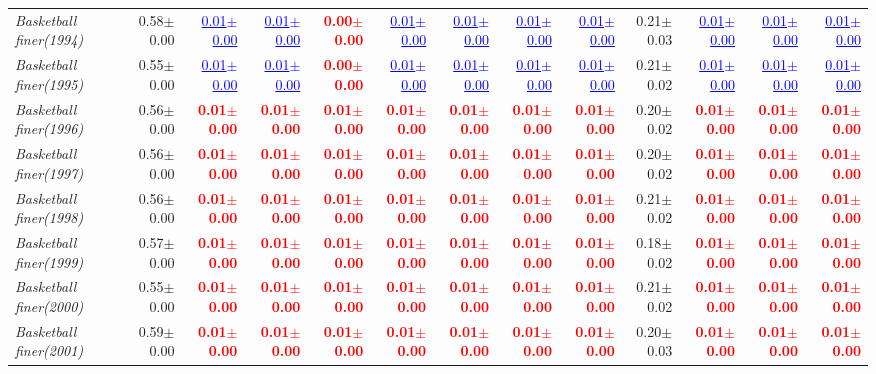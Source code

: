 \documentclass[nohyperref]{article}
\theoremstyle{plain}
\theoremstyle{definition}
\theoremstyle{remark}
\newcommand{\red}[1]{\textcolor{red}{\textbf{#1}}}
\newcommand{\blue}[1]{\textcolor{blue}{\underline{#1}}}
\begin{document}
\begin{table*}[!ht]
{\begin{tabular}{lrr|rrrrr|rrrrr}
			{\it Basketball finer(1994)} & 0.58$\pm$0.00 & \blue{0.01$\pm$0.00} & \blue{0.01$\pm$0.00} & \red{0.00$\pm$0.00} & \blue{0.01$\pm$0.00} & \blue{0.01$\pm$0.00} & \blue{0.01$\pm$0.00} & \blue{0.01$\pm$0.00} & 0.21$\pm$0.03 & \blue{0.01$\pm$0.00} & \blue{0.01$\pm$0.00} & \blue{0.01$\pm$0.00} \\
			{\it Basketball finer(1995)} & 0.55$\pm$0.00 & \blue{0.01$\pm$0.00} & \blue{0.01$\pm$0.00} & \red{0.00$\pm$0.00} & \blue{0.01$\pm$0.00} & \blue{0.01$\pm$0.00} & \blue{0.01$\pm$0.00} & \blue{0.01$\pm$0.00} & 0.21$\pm$0.02 & \blue{0.01$\pm$0.00} & \blue{0.01$\pm$0.00} & \blue{0.01$\pm$0.00} \\
			{\it Basketball finer(1996)} & 0.56$\pm$0.00 & \red{0.01$\pm$0.00} & \red{0.01$\pm$0.00} & \red{0.01$\pm$0.00} & \red{0.01$\pm$0.00} & \red{0.01$\pm$0.00} & \red{0.01$\pm$0.00} & \red{0.01$\pm$0.00} & 0.20$\pm$0.02 & \red{0.01$\pm$0.00} & \red{0.01$\pm$0.00} & \red{0.01$\pm$0.00} \\
			{\it Basketball finer(1997)} & 0.56$\pm$0.00 & \red{0.01$\pm$0.00} & \red{0.01$\pm$0.00} & \red{0.01$\pm$0.00} & \red{0.01$\pm$0.00} & \red{0.01$\pm$0.00} & \red{0.01$\pm$0.00} & \red{0.01$\pm$0.00} & 0.20$\pm$0.02 & \red{0.01$\pm$0.00} & \red{0.01$\pm$0.00} & \red{0.01$\pm$0.00} \\
			{\it Basketball finer(1998)} & 0.56$\pm$0.00 & \red{0.01$\pm$0.00} & \red{0.01$\pm$0.00} & \red{0.01$\pm$0.00} & \red{0.01$\pm$0.00} & \red{0.01$\pm$0.00} & \red{0.01$\pm$0.00} & \red{0.01$\pm$0.00} & 0.21$\pm$0.02 & \red{0.01$\pm$0.00} & \red{0.01$\pm$0.00} & \red{0.01$\pm$0.00} \\
			{\it Basketball finer(1999)} & 0.57$\pm$0.00 & \red{0.01$\pm$0.00} & \red{0.01$\pm$0.00} & \red{0.01$\pm$0.00} & \red{0.01$\pm$0.00} & \red{0.01$\pm$0.00} & \red{0.01$\pm$0.00} & \red{0.01$\pm$0.00} & 0.18$\pm$0.02 & \red{0.01$\pm$0.00} & \red{0.01$\pm$0.00} & \red{0.01$\pm$0.00} \\
			{\it Basketball finer(2000)} & 0.55$\pm$0.00 & \red{0.01$\pm$0.00} & \red{0.01$\pm$0.00} & \red{0.01$\pm$0.00} & \red{0.01$\pm$0.00} & \red{0.01$\pm$0.00} & \red{0.01$\pm$0.00} & \red{0.01$\pm$0.00} & 0.21$\pm$0.02 & \red{0.01$\pm$0.00} & \red{0.01$\pm$0.00} & \red{0.01$\pm$0.00} \\
			{\it Basketball finer(2001)} & 0.59$\pm$0.00 & \red{0.01$\pm$0.00} & \red{0.01$\pm$0.00} & \red{0.01$\pm$0.00} & \red{0.01$\pm$0.00} & \red{0.01$\pm$0.00} & \red{0.01$\pm$0.00} & \red{0.01$\pm$0.00} & 0.20$\pm$0.03 & \red{0.01$\pm$0.00} & \red{0.01$\pm$0.00} & \red{0.01$\pm$0.00} \\

\end{tabular}}
\end{table*}
\end{document}
